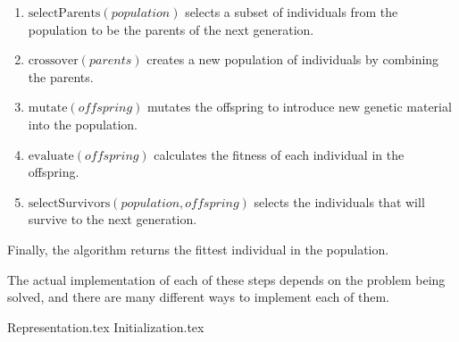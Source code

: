  \begin{enumerate}
    \item \(\mathrm{selectParents}(\mathit{population})\) selects a subset of individuals from the
      population to be the parents of the next generation.
    \item \(\mathrm{crossover}(\mathit{parents})\) creates a new population of individuals by
      combining the parents.
    \item \(\mathrm{mutate}(\mathit{offspring})\) mutates the offspring to introduce new genetic
      material into the population.
    \item \(\mathrm{evaluate}(\mathit{offspring})\) calculates the fitness of each individual in the
      offspring.
    \item \(\mathrm{selectSurvivors}(\mathit{population}, \mathit{offspring})\) selects the
      individuals that will survive to the next generation.
  \end{enumerate}

  Finally, the algorithm returns the fittest individual in the population.

  The actual implementation of each of these steps depends on the problem being solved, and there
  are many different ways to implement each of them.

  {Representation.tex}
  {Initialization.tex}
